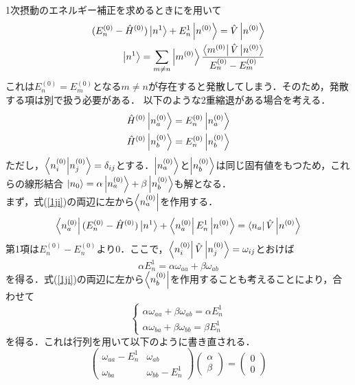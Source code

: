 \documentclass{report}
\begin{document}
  1次摂動のエネルギー補正を求めるときにを用いて
  \begin{align}
    \label{1ji}
    (E_n^{(0)}-\hat{H}^{(0)})\ket{n^1}+E_n^1\ket{n^{(0)}}=\hat{V}\ket{n^{(0)}}\\
    \ket{n^1}=\sum_{m\ne n}\ket{m^{(0)}}\frac{\bra{m^{(0)}}\hat{V}\ket{n^{(0)}}}{E_n^{(0)}-E_m^{(0)}}
  \end{align}
  これは$E_n^{(0)}=E_m^{(0)}$となる$m\ne n$が存在すると発散してしまう．そのため，発散する項は別で扱う必要がある．
  以下のような2重縮退がある場合を考える．
  \begin{align}
    \hat{H}^{(0)}\ket{n_a^{(0)}}&=E_n^{(0)}\ket{n_a^{(0)}}\\
    \hat{H}^{(0)}\ket{n_b^{(0)}}&=E_n^{(0)}\ket{n_b^{(0)}}
  \end{align}
  ただし，$\braket{n_i^{(0)}}{n_j^{(0)}}=\delta_{ij}$とする．$\ket{n_a^{(0)}}$と$\ket{n_b^{(0)}}$は同じ固有値をもつため，これらの線形結合
  $\ket{n_0}=\alpha\ket{n_a^{(0)}}+\beta\ket{n_b^{(0)}}$も解となる．\\
  まず，式(\ref{1ji})の両辺に左から$\bra{n_a^{(0)}}$を作用する．
  \begin{equation}
    \bra{n_a^{(0)}}(E_n^{(0)}-\hat{H}^{(0)})\ket{n^1}+\bra{n_a^{(0)}}E_n^1\ket{n^{(0)}}=\bra{n_a}\hat{V}\ket{n^{(0)}}
  \end{equation}
  第1項は$E_n^{(0)}-E_n^{(0)}$より0．ここで，$\bra{n_i^{(0)}}\hat{V}\ket{n_j^{(0)}}=\omega_{ij}$とおけば
  \begin{equation}
    \alpha E_n^1=\alpha\omega_{aa}+\beta\omega_{ab}
  \end{equation}
  を得る．式(\ref{1ji})の両辺に左から$\bra{n_b^{(0)}}$を作用することも考えることにより，合わせて
  \begin{equation}
    \begin{cases}
      \alpha\omega_{aa}+\beta\omega_{ab}=\alpha E_n^1\\
      \alpha\omega_{ba}+\beta\omega_{bb}=\beta E_n^1
    \end{cases}
  \end{equation}
  を得る．これは行列を用いて以下のように書き直される．
  \begin{equation}
    \label{gyouretu}
    \begin{pmatrix}
      \omega_{aa}-E_n^1&\omega_{ab}\\
      \omega_{ba}&\omega_{bb}-E_n^1
    \end{pmatrix}
    \begin{pmatrix}
      \alpha\\
      \beta
    \end{pmatrix}
    =
    \begin{pmatrix}
      0\\0
    \end{pmatrix}
  \end{equation}
\end{document}
